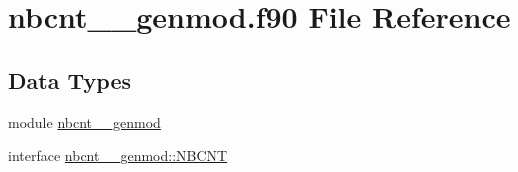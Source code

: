 \hypertarget{nbcnt____genmod_8f90}{\section{nbcnt\+\_\+\+\_\+genmod.\+f90 File Reference}
\label{nbcnt____genmod_8f90}
}
\subsection*{Data Types}
\begin{DoxyCompactItemize}
\item 
module \hyperlink{classnbcnt____genmod}{nbcnt\+\_\+\+\_\+genmod}
\item 
interface \hyperlink{interfacenbcnt____genmod_1_1NBCNT}{nbcnt\+\_\+\+\_\+genmod\+::\+N\+B\+C\+N\+T}
\end{DoxyCompactItemize}
